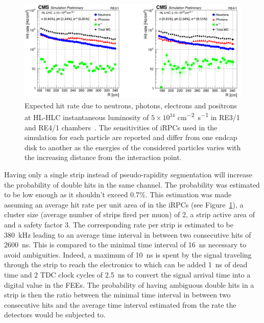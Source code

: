 	\begin{figure}[H]
		\centering
		\includegraphics[width=\textwidth]{fig/chapt4/RPC-Sim-HL-LHC_Rate.png}
		\caption{\label{fig:iRPC-Rate} Expected hit rate due to neutrons, photons, electrons and positrons at HL-HLC instantaneous luminosity of $5\times10^{34}$ \si{cm^{-2}s^{-1}} in RE3/1 and RE4/1 chambers~\cite{ANDREA2018,ANDREA2018PROC}. The sensitivities of iRPCs used in the simulation for each particle are reported and differ from one endcap disk to another as the energies of the considered particles varies with the increasing distance from the interaction point.}
	\end{figure}
	
	Having only a single strip instead of pseudo-rapidity segmentation will increase the probability of double hits in the same channel. The probability was estimated to be low enough as it shouldn't exceed 0.7\%. This estimation was made assuming an average hit rate per unit area of  in the iRPCs (see Figure~\ref{fig:iRPC-Rate}), a cluster size (average number of strips fired per muon) of 2, a strip active area of  and a safety factor 3. The corresponding rate per strip is estimated to be \SI{380}{kHz} leading to an average time interval in between two consecutive hits of \SI{2600}{ns}. This is compared to the minimal time interval of \SI{16}{ns} necessary to avoid ambiguities. Indeed, a maximum of \SI{10}{ns} is spent by the signal traveling through the strip to reach the electronics to which can be added \SI{1}{ns} of dead time and 2 \acf{TDC} clock cycles of \SI{2.5}{ns} to convert the signal arrival time into a digital value in the FEEs. The probability of having ambiguous double hits in a strip is then the ratio between the minimal time interval in between two consecutive hits and the average time interval estimated from the rate the detectors would be subjected to.
	
